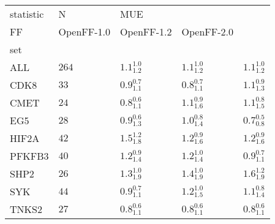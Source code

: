 \begin{tabular}{lllll}
\toprule
statistic &      N & \multicolumn{3}{l}{MUE} \\
FF &         OpenFF-1.0 &         OpenFF-1.2 &         OpenFF-2.0 \\
set    &        &                    &                    &                    \\
\midrule
ALL    &  $264$ &  $1.1^{1.0}_{1.2}$ &  $1.1^{1.0}_{1.2}$ &  $1.1^{1.0}_{1.2}$ \\
CDK8   &   $33$ &  $0.9^{0.7}_{1.1}$ &  $0.8^{0.7}_{1.1}$ &  $1.1^{0.9}_{1.3}$ \\
CMET   &   $24$ &  $0.8^{0.6}_{1.1}$ &  $1.1^{0.9}_{1.6}$ &  $1.1^{0.8}_{1.5}$ \\
EG5    &   $28$ &  $0.9^{0.6}_{1.3}$ &  $1.0^{0.8}_{1.4}$ &  $0.7^{0.5}_{0.8}$ \\
HIF2A  &   $42$ &  $1.5^{1.2}_{1.8}$ &  $1.2^{0.9}_{1.6}$ &  $1.2^{0.9}_{1.6}$ \\
PFKFB3 &   $40$ &  $1.2^{0.9}_{1.4}$ &  $1.2^{1.0}_{1.4}$ &  $0.9^{0.7}_{1.1}$ \\
SHP2   &   $26$ &  $1.3^{1.0}_{1.9}$ &  $1.4^{1.0}_{1.9}$ &  $1.6^{1.2}_{1.9}$ \\
SYK    &   $44$ &  $0.9^{0.7}_{1.1}$ &  $1.2^{1.0}_{1.5}$ &  $1.1^{0.8}_{1.4}$ \\
TNKS2  &   $27$ &  $0.8^{0.6}_{1.1}$ &  $0.8^{0.6}_{1.1}$ &  $0.8^{0.6}_{1.1}$ \\
\bottomrule
\end{tabular}
